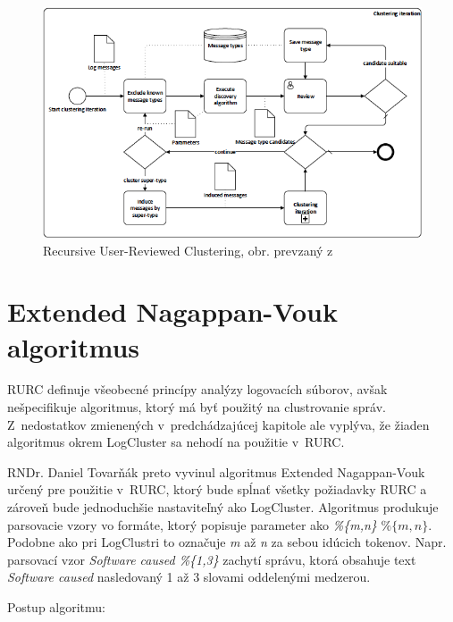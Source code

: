\begin{figure}[htbp]
 \centering 
 \begin{minipage}{\linewidth}
 	\centering
 	\includegraphics[width=\textwidth]{images/RURC.png} 	
 \end{minipage}
  \caption{Recursive User-Reviewed Clustering, obr. prevzaný z~\parencite{Tovarnak2017}}
  \label{fig:rurc}
\end{figure}


\section{Extended Nagappan-Vouk algoritmus}
\label{sec:eng}
RURC definuje všeobecné princípy analýzy logovacích súborov, avšak nešpecifikuje algoritmus, ktorý má byť použitý na clustrovanie správ.
Z~nedostatkov zmienených v~predchádzajúcej kapitole ale vyplýva, že žiaden algoritmus okrem LogCluster sa nehodí na použitie v~RURC.
\par RNDr. Daniel Tovarňák preto vyvinul algoritmus Extended Na\-gappan-Vouk určený pre použitie v~RURC, ktorý bude spĺnať všetky požiadavky RURC a zároveň bude jednoduchšie nastaviteľný ako LogCluster. Algoritmus produkuje parsovacie vzory vo formáte, ktorý popisuje parameter ako \emph{\%\{m,n\}} $\%\{m,n\}$. Podobne ako pri LogClustri to označuje \emph{m} až \emph{n} za sebou idúcich tokenov. Napr. parsovací vzor \emph{Software caused \%\{1,3\}} zachytí správu, ktorá obsahuje text \emph{Software caused} nasledovaný 1 až 3 slovami oddelenými medzerou. \newpage \par Postup algoritmu:

